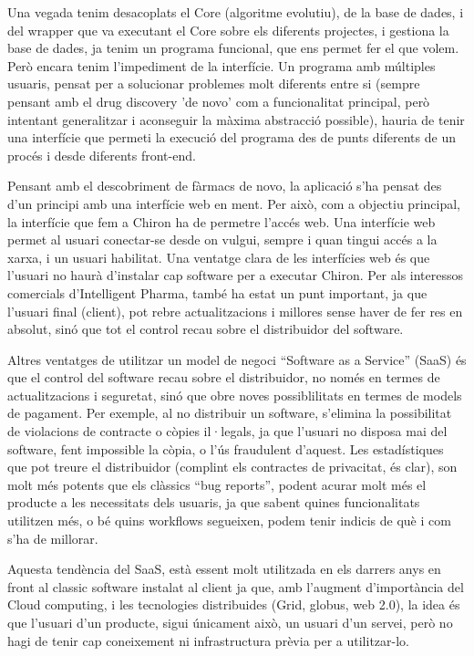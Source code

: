 \documentclass[titlepage,a4paper,12pt]{book}
\begin{document}
Una vegada tenim desacoplats el Core (algoritme evolutiu), de la base de dades,
i del wrapper que va executant el Core sobre els diferents projectes, i gestiona
la base de dades, ja tenim un programa funcional, que ens permet fer el que
volem.  Però encara tenim l'impediment de la interfície.  Un programa amb
múltiples usuaris, pensat per a solucionar problemes molt diferents entre si
(sempre pensant amb el drug discovery 'de novo' com a funcionalitat principal,
 però intentant generalitzar i aconseguir la màxima abstracció possible), hauria
de tenir una interfície que permeti la execució del programa des de punts
diferents de un procés i desde diferents front-end.  

Pensant amb el descobriment de fàrmacs de novo, la aplicació s'ha pensat des
d'un principi amb una interfície web en ment.  Per això, com a objectiu
principal, la interfície que fem a Chiron ha de permetre l'accés web.  Una
interfície web permet al usuari conectar-se desde on vulgui, sempre i quan
tingui accés a la xarxa, i un usuari habilitat.  Una ventatge clara de les
interfícies web és que l'usuari no haurà d'instalar cap software per a executar
Chiron.  Per als interessos comercials d'Intelligent Pharma, també ha estat un
punt important, ja que l'usuari  final (client), pot rebre actualitzacions i
millores sense haver de fer res en absolut, sinó que tot el control recau sobre
el distribuidor del software.

Altres ventatges de utilitzar un model de negoci ``Software as a Service''
(SaaS) és que el control del software recau sobre el distribuidor, no només en
termes de actualitzacions i seguretat, sinó que obre noves possiblilitats en
termes de models de pagament.   Per exemple, al no distribuir un software,
	   s'elimina la possibilitat de violacions de contracte o còpies il·legals, ja que
	   l'usuari no disposa mai del software, fent impossible la còpia, o l'ús
	   fraudulent d'aquest.  Les estadístiques que pot treure el distribuidor (complint
			   els contractes de privacitat, és clar), son molt més potents que els clàssics
	   ``bug reports'', podent acurar molt més el producte a les necessitats dels
	   usuaris, ja que sabent quines funcionalitats utilitzen més, o bé quins workflows
	   segueixen, podem tenir indicis de què i com s'ha de millorar.

	   Aquesta tendència del SaaS, està essent molt utilitzada en els darrers anys en
	   front al classic software instalat al client ja que, amb l'augment d'importància
	   del Cloud computing, i les tecnologies distribuides (Grid, globus, web 2.0), la
	   idea és que l'usuari d'un producte, sigui únicament això, un usuari d'un servei,
	   però no hagi de tenir cap coneixement ni infrastructura prèvia per a
	   utilitzar-lo.
\end{document}
